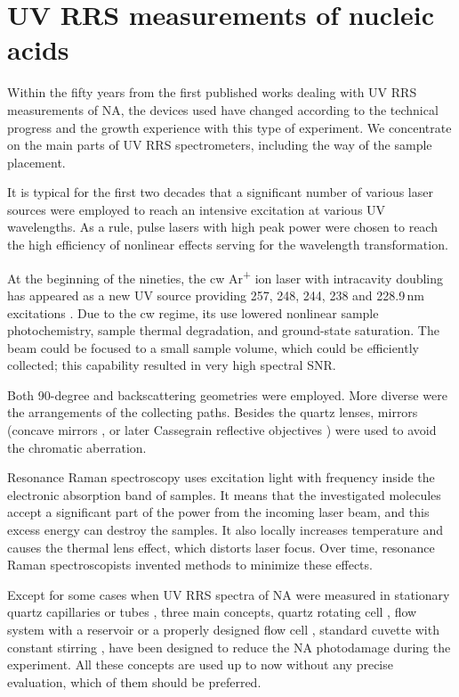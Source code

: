 \chapter{UV RRS measurements of nucleic acids}

Within the fifty years from the first published works dealing with UV RRS
measurements of NA, the devices used have changed according to the technical
progress and the growth experience with this type of experiment.
We concentrate on the main parts of UV RRS spectrometers, including the way of
the sample placement.

It is typical for the first two decades that a significant number of various
laser sources were employed to reach an intensive excitation at various UV
wavelengths.
As a rule, pulse lasers with high peak power were chosen to reach the high
efficiency of nonlinear effects serving for the wavelength transformation.

At the beginning of the nineties,
the cw Ar\textsuperscript{+} ion laser with intracavity
doubling has appeared as a new UV source providing 257, 248, 244, 238 and
228.9\,nm excitations
\parencite{%
	Asher1993b%
}.
Due to the cw regime, its use lowered nonlinear sample photochemistry, sample
thermal degradation, and ground-state saturation.
The beam could be focused to a small sample volume, which could be efficiently
collected; this capability resulted in very high spectral SNR.

Both 90-degree and backscattering geometries were employed.
More diverse were the arrangements of the collecting paths.
Besides the quartz lenses, mirrors (concave mirrors
\cite{Blazej1977},
or later Cassegrain reflective objectives
\cite{%
	Toyama1991%
})
were used to avoid the chromatic aberration.

Resonance Raman spectroscopy uses excitation light with frequency inside the
electronic absorption band of samples.
It means that the investigated molecules accept a significant part of the power
from the incoming laser beam, and this excess energy can destroy the samples.
It also locally increases temperature and causes the thermal lens effect, which
distorts laser focus.
Over time, resonance Raman spectroscopists invented methods to minimize these
effects.

Except for some cases when UV RRS spectra of NA were measured in stationary
quartz capillaries or tubes
\parencite{%
	Blazej1977%
},
three main concepts, quartz rotating cell
\parencite{%
	Kiefer1971,%
	Kiefer1971a,%
},
flow system with a reservoir
\parencite{Ziegler1981}
or a properly designed flow cell
\parencite{Blazej1980},
standard cuvette with constant stirring
\parencite{Jolles1984},
have been designed to reduce the NA photodamage during the
experiment.
All these concepts are used up to now without any precise evaluation, which of
them should be preferred.

